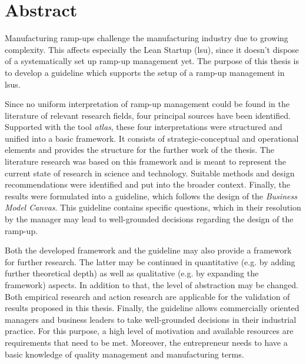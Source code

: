 \chapter*{Abstract}
Manufacturing ramp-ups challenge the manufacturing industry due to growing complexity. This affects especially the Lean Startup (\gls{lsu}), since it doesn't dispose of a systematically set up ramp-up management yet. The purpose of this thesis is to develop a guideline which supports the setup of a ramp-up management in \gls{lsu}s. 

Since no uniform interpretation of ramp-up management could be found in the literature of relevant research fields, four principal sources have been identified.
Supported with the tool \textit{\gls{atlas}}, these four interpretations were structured and unified into a basic framework. It consists of strategic-conceptual and operational elements and provides the structure for the further work of the thesis. The literature research was based on this framework and is meant to represent the current state of research in science and technology. Suitable methods and design recommendations were identified and put into the broader context. Finally, the results were formulated into a guideline, which follows the design of the \textit{Business Model Canvas}. This guideline contains specific questions, which in their resolution by the manager may lead to well-grounded decisions regarding the design of the ramp-up.

Both the developed framework and the guideline may also provide a framework for further research. %
The latter may be continued in quantitative (e.g. by adding further theoretical depth) as well as qualitative (e.g. by expanding the framework) aspects. In addition to that, the level of abstraction may be changed. Both empirical research and action research are applicable for the validation of results proposed in this thesis. 
Finally, the guideline allows commercially oriented managers and business leaders to take well-grounded decisions in their industrial practice. For this purpose, a high level of motivation and available resources are requirements that need to be met. Moreover, the entrepreneur needs to have a basic knowledge of quality management and manufacturing terms. 

